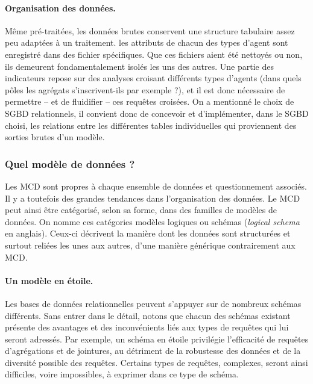 \paragraph{Organisation des données.}
Même pré-traitées, les données brutes conservent une structure tabulaire assez peu adaptées à un traitement.
les attributs de chacun des types d'agent sont enregistré dans des fichier spécifiques.
Que ces fichiers aient été nettoyés ou non, ils demeurent fondamentalement isolés les uns des autres.
Une partie des indicateurs repose sur des analyses croisant différents types d'agents (dans quels pôles les agrégats s'inscrivent-ils par exemple ?), et il est donc nécessaire de permettre -- et de fluidifier -- ces requêtes croisées.
On a mentionné le choix de SGBD relationnels, il convient donc de concevoir et d'implémenter, dans le SGBD choisi, les relations entre les différentes tables individuelles qui proviennent des sorties brutes d'un modèle.



\subsubsection{Quel modèle de données ?}

Les MCD sont propres à chaque ensemble de données et questionnement associés.
Il y a toutefois des grandes tendances dans l'organisation des données.
Le MCD peut ainsi être catégorisé, selon sa forme, dans des familles de modèles de données.
On nomme ces catégories \og modèles logiques\fg{} ou \og schémas\fg{} (\textit{logical schema} en anglais).
Ceux-ci décrivent la manière dont les données sont structurées et surtout reliées les unes aux autres, d'une manière générique contrairement aux MCD.

\paragraph{Un modèle \og en étoile\fg{}.}

Les bases de données relationnelles peuvent s'appuyer sur de nombreux schémas différents.
Sans entrer dans le détail, notons que chacun des schémas existant présente des avantages et des inconvénients liés aux types de requêtes qui lui seront adressés.
Par exemple, un schéma \og en étoile\fg{} \autocite{noauthor_star_2018} privilégie l'efficacité de requêtes d'agrégations et de jointures, au détriment de la robustesse des données et de la diversité possible des requêtes.
Certains types de requêtes, complexes, seront ainsi difficiles, voire impossibles, à exprimer dans ce type de schéma.

